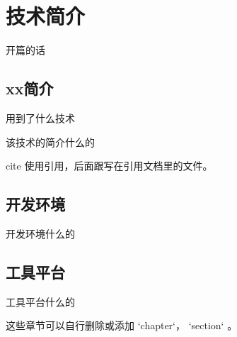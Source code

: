 \chapter{技术简介}
\label{cha:techIntro}

开篇的话

\section{xx简介}
\label{sec:engineIntro}

用到了什么技术

该技术的简介什么的\cite{cccManual}

cite 使用引用，后面跟写在引用文档里的文件。

\section{开发环境}
\label{sec:devEnv}

开发环境什么的~

\section{工具平台}
\label{sec:toolPlatform}

工具平台什么的~

这些章节可以自行删除或添加 `chapter`， `section` 。